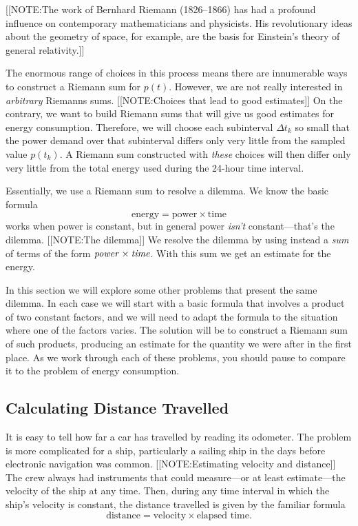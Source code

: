 [[NOTE:The work of Bernhard Riemann (1826--1866) has had a profound influence on contemporary mathematicians and physicists.  His revolutionary ideas about the geometry of space, for example, are the basis for Einstein's theory of general relativity.]]

The enormous range of choices in this process means there are
innumerable ways to construct a Riemann sum for $p(t)$.  However, we
are not really interested in {\em arbitrary\/} Riemanns sums.
[[NOTE:Choices that lead  to good estimates]]
On the contrary, we want to build Riemann sums that will give us good
estimates for energy consumption.  Therefore, we will choose each
subinterval $\Delta t_k$ so small that the power demand over that
subinterval differs only very little from the sampled value $p(t_k)$.
A Riemann sum constructed with {\em these\/} choices will then differ
only very little from the total energy used during the 24-hour time
interval.

	Essentially, we use a Riemann sum to resolve a dilemma.  We know the basic formula
	\[
\mbox{energy} = \mbox{power} \times \mbox{time}
\]
works when power is constant, but in general power {\em isn't\/} constant---that's the dilemma.  
	[[NOTE:The dilemma]]
We resolve the dilemma by using instead a {\em sum\/} of terms of the form $\mbox{\em power\/} \times \mbox{\em time\/}$.  With this sum we get an estimate for the energy.

	In this section we will explore some other problems that present the same dilemma.  In each case we will start with a basic formula that involves a product of two constant factors, and we will need to adapt the formula to the situation where one of the factors varies.  The solution will be to construct a Riemann sum of such products, producing an estimate for the quantity we were after in the first place.  As we work through each of these problems, you should pause to compare it to the problem of energy consumption.


\subsection{Calculating Distance Travelled}
\label{subsec:calculating-distance-travelled}

	It is easy to tell how far a car has travelled by reading its odometer.  The problem is more complicated for a ship, particularly a sailing ship in the days before electronic navigation was common.  
	[[NOTE:Estimating velocity  and distance]]
The crew always had instruments that could measure---or at least estimate---the velocity of the ship at any time.  Then, during any time interval in which the ship's velocity is constant, the distance travelled is given by the familiar formula
	\[
\mbox{distance} = \mbox{velocity} \times 
		\mbox{elapsed time}.
\]

